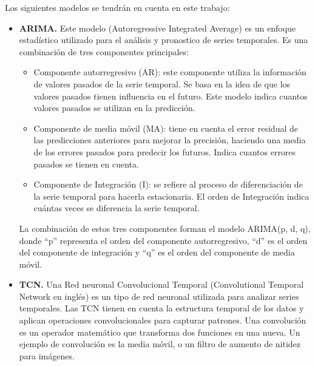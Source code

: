 Los siguientes modelos se tendrán en cuenta en este trabajo:
\begin{itemize}
    \item \textbf{ARIMA.} Este modelo (Autoregressive Integrated Average) \cite{hyndman2018forecasting} es un enfoque estadístico utilizado para 
        el análisis y pronostico de series temporales. Es una combinación de tres componentes principales:
        \begin{itemize}
            \item Componente autorregresivo (AR): este componente utiliza la información de valores pasados de la
                serie temporal. Se basa en la idea de que los valores pasados tienen influencia en el futuro. Este 
                modelo indica cuantos valores pasados se utilizan en la predicción.
            \item Componente de media móvil (MA): tiene en cuenta el error residual de las predicciones anteriores 
                para mejorar la precisión, haciendo una media de los errores pasados para predecir los futuros. 
                Indica cuantos errores pasados se tienen en cuenta.
            \item Componente de Integración (I): se refiere al proceso de diferenciación de la serie temporal para 
                hacerla estacionaria. El orden de Integración indica cuántas veces se diferencia la serie temporal.
        \end{itemize}
        La combinación de estos tres componentes forman el modelo ARIMA(p, d, q), donde ``p'' representa el orden 
        del componente autorregresivo, ``d'' es el orden del componente de integración y ``q'' es el orden del componente 
        de media móvil.
    \item \textbf{TCN.} Una Red neuronal Convolucional Temporal (Convolutional Temporal Network en inglés) \cite{DBLP:journals/corr/abs-1803-01271} es un tipo de 
        red neuronal utilizada para analizar series temporales. Las TCN tienen en cuenta la estructura temporal de los datos 
        y aplican operaciones convolucionales para capturar patrones. Una convolución \cite{matlab:convolucion} es un operador matemático que transforma 
        dos funciones en una nueva. Un ejemplo de convolución es la media móvil, o un filtro de aumento de nitidez para imágenes.


\end{itemize}
